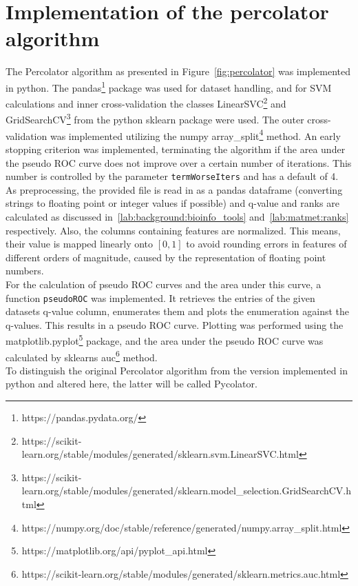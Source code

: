 \section{Implementation of the percolator algorithm}
The Percolator algorithm as presented in Figure~\ref{fig:percolator} was implemented in python. The pandas\footnote{https://pandas.pydata.org/} package was used for dataset handling, and for SVM calculations and inner cross-validation the classes LinearSVC\footnote{https://scikit-learn.org/stable/modules/generated/sklearn.svm.LinearSVC.html} and GridSearchCV\footnote{https://scikit-learn.org/stable/modules/generated/sklearn.model\_selection.GridSearchCV.html} from the python sklearn package were used. The outer cross-validation was implemented utilizing the numpy array\_split\footnote{https://numpy.org/doc/stable/reference/generated/numpy.array\_split.html} method. An early stopping criterion was implemented, terminating the algorithm if the area under the pseudo ROC curve does not improve over a certain number of iterations. This number is controlled by the parameter \texttt{termWorseIters} and has a default of 4.\\
\label{lab:matmet:normalization}As preprocessing, the provided file is read in as a pandas dataframe (converting strings to floating point or integer values if possible) and q-value and ranks are calculated as discussed in~\ref{lab:background:bioinfo_tools} and~\ref{lab:matmet:ranks} respectively. Also, the columns containing features are normalized. This means, their value is mapped linearly onto $[0,1]$ to avoid rounding errors in features of different orders of magnitude, caused by the representation of floating point numbers.\\
\label{lab:matmet:pseudoROC}For the calculation of pseudo ROC curves and the area under this curve, a function \texttt{pseudoROC} was implemented. It retrieves the entries of the given datasets q-value column, enumerates them and plots the enumeration against the q-values. This results in a pseudo ROC curve. Plotting was performed using the matplotlib.pyplot\footnote{https://matplotlib.org/api/pyplot\_api.html} package, and the area under the pseudo ROC curve was calculated by sklearns auc\footnote{https://scikit-learn.org/stable/modules/generated/sklearn.metrics.auc.html} method.\\
To distinguish the original Percolator algorithm from the version implemented in python and altered here, the latter will be called Pycolator.

